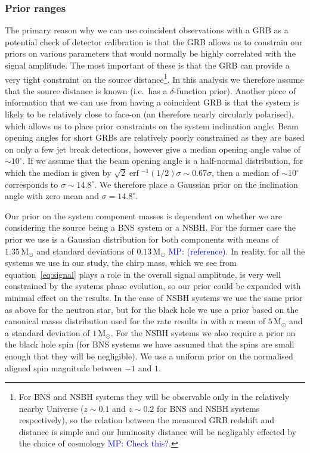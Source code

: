 \documentclass[10pt]{iopart}
\newcommand{\MP}[1]{\textcolor{blue}{MP: #1}}
\DeclareMathOperator{\erf}{erf}
\begin{document}
\subsubsection{Prior ranges}\label{sec:priors}

The primary reason why we can use coincident observations with a GRB as a potential check of 
detector calibration is that the GRB allows us to constrain our priors on various parameters that 
would normally be highly correlated with the signal amplitude. The most important of these is that 
the GRB can provide a very tight constraint on the source distance\footnote{For \ac{BNS} and 
\ac{NSBH} systems they will be observable only in the relatively nearby Universe ($z \sim 
0.1$ and $z\sim 0.2$ for \ac{BNS} and \ac{NSBH} systems respectively), so the relation between the 
measured GRB redshift and distance is simple and our luminosity distance will be negligably 
effected by the choice of cosmology \MP{Check this?}.}. In this analysis we therefore assume that 
the source distance is known (i.e.\ has a $\delta$-function prior). Another piece of information 
that we can use from having a coincident GRB is that the system is likely to be relatively close to 
face-on (an therefore nearly circularly polarised), which allows us to place prior constraints on 
the system inclination angle. Beam opening angles for short GRBs are relatively poorly constrained 
as they are based on only a few jet break detections, however \cite{2014ApJ...780..118F} give a 
median opening angle value of $\sim 10^{\circ}$. If we assume that the beam opening angle is a 
half-normal distribution, for which the median is given by $\sqrt{2}\erf{}^{-1}(1/2)\sigma \sim 
0.67\sigma$, then a median of $\sim 10^{\circ}$ corresponds to $\sigma \sim 14.8^{\circ}$. We 
therefore place a Gaussian prior on the inclination angle with zero mean and $\sigma=14.8^{\circ}$.

Our prior on the system component masses is dependent on whether we are considering the source 
being a \ac{BNS} system or a \ac{NSBH}. For the former case the prior we use is a Gaussian 
distribution for both components with means of $1.35\,\textrm{M}_{\odot}$ and standard deviations 
of $0.13\,\textrm{M}_{\odot}$ \MP{(reference)}. In reality, for all the systems we use in our 
study, the chirp mass, which we see from equation~\ref{eq:signal} plays a role in the overall 
signal amplitude, is very well constrained by the systems phase evolution, so our prior could be 
expanded with minimal effect on the results. In the case of \ac{NSBH} systems we use the same 
prior as above for the neutron star, but for the black hole we use a prior based on the 
canonical masss distribution used for the rate results in \cite{2012PhRvD..85h2002A} with a mean of 
$5\,\textrm{M}_{\odot}$ and a standard deviation of $1\,\textrm{M}_{\odot}$. For the \ac{NSBH}
systems we also require a prior on the black hole spin (for \ac{BNS} systems we have assumed that 
the spins are small enough that they will be negligible). We use a uniform prior on the 
normalised aligned spin magnitude between $-1$ and $1$.
\end{document}
